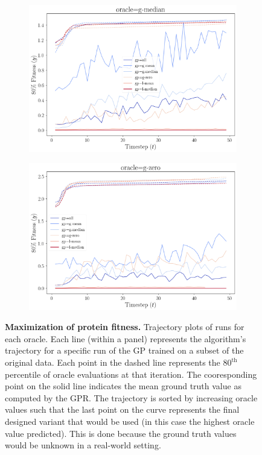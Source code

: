 \documentclass{article}
\begin{document}
\begin{figure}[htbp]
\begin{subfigure}[b]{0.49\linewidth}
    \includegraphics[width=\linewidth]{figures/pred_vs_gt_fitness_explored(median).png}
  \end{subfigure}
  \hfill
  \begin{subfigure}[b]{0.49\linewidth}
    \centering
    \includegraphics[width=\linewidth]{figures/pred_vs_gt_fitness_explored(zero).png}
  \end{subfigure}
  \caption{
    \textbf{Maximization of protein fitness.} Trajectory plots of runs for each
    oracle. Each line (within a panel) represents the algorithm's trajectory for
    a specific run of the GP trained on a subset of the original data. Each
    point in the dashed line represents the $80^{\text{th}}$ percentile of
    oracle evaluations at that iteration. The cooresponding point on the solid
    line indicates the mean ground truth value as computed by the GPR. The
    trajectory is sorted by increasing oracle values such that the last point on
    the curve represents the final designed variant that would be used (in this
    case the highest oracle value predicted). This is done because the ground
    truth values would be unknown in a real-world setting.
  }
  \label{fig:search_model_qth_percentile}
\end{figure}
\end{document}
